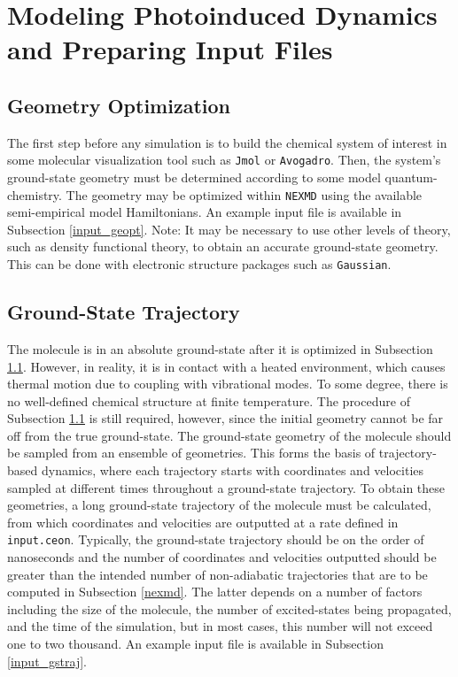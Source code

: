\documentclass[letterpaper,12pt,titlepage]{article}
\begin{document}
\newpage
\section{Modeling Photoinduced Dynamics and Preparing Input Files}
\label{prepinputs}

\subsection{Geometry Optimization}
\label{geopt}
The first step before any simulation is to build the chemical system of interest in some molecular visualization tool such as \verb+Jmol+ or \verb+Avogadro+.  Then, the system's ground-state geometry must be determined according to some model quantum-chemistry.  The geometry may be optimized within \verb+NEXMD+ using the available semi-empirical model Hamiltonians.  An example input file is available in Subsection \ref{input_geopt}.  Note: It may be necessary to use other levels of theory, such as density functional theory, to obtain an accurate ground-state geometry.  This can be done with electronic structure packages such as \verb+Gaussian+.

\subsection{Ground-State Trajectory}
\label{gstraj}
The molecule is in an absolute ground-state after it is optimized in Subsection \ref{geopt}.  However, in reality, it is in contact with a heated environment, which causes thermal motion due to coupling with vibrational modes.  To some degree, there is no well-defined chemical structure at finite temperature.  The procedure of Subsection \ref{geopt} is still required, however, since the initial geometry cannot be far off from the true ground-state.  The ground-state geometry of the molecule should be sampled from an ensemble of geometries.  This forms the basis of trajectory-based dynamics, where each trajectory starts with coordinates and velocities sampled at different times throughout a ground-state trajectory.  To obtain these geometries, a long ground-state trajectory of the molecule must be calculated, from which coordinates and velocities are outputted at a rate defined in \verb+input.ceon+.  Typically, the ground-state trajectory should be on the order of nanoseconds and the number of coordinates and velocities outputted should be greater than the intended number of non-adiabatic trajectories that are to be computed in Subsection \ref{nexmd}.  The latter depends on a number of factors including the size of the molecule, the number of excited-states being propagated, and the time of the simulation, but in most cases, this number will not exceed one to two thousand.  An example input file is available in Subsection \ref{input_gstraj}.
\end{document}
